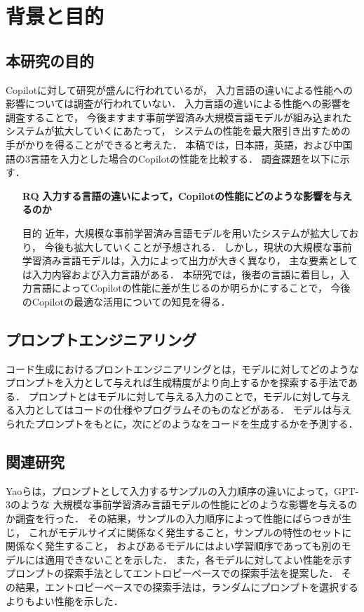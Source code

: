 \section{背景と目的\label{related_research}}

\subsection{本研究の目的}
  Copilotに対して研究が盛んに行われている\cite{Yao2022ACL}\cite{Nguyen2022MSR}\cite{Sobania2022GECCO}\cite{Dakhel2022arXiv}\cite{Vaithilingam2022CHI}が，
  入力言語の違いによる性能への影響については調査が行われていない．
  入力言語の違いによる性能への影響を調査することで，
  今後ますます事前学習済み大規模言語モデルが組み込まれたシステムが拡大していくにあたって，
  システムの性能を最大限引き出すための手がかりを得ることができると考えた．
  本稿では，日本語，英語，および中国語の3言語を入力とした場合のCopilotの性能を比較する．
  調査課題を以下に示す．

  
  \begin{itemize}
    \item[\textbf{RQ}] \textbf{入力する言語の違いによって，Copilotの性能にどのような影響を与えるのか}
      \item[目的]{近年，大規模な事前学習済み言語モデルを用いたシステムが拡大しており，
      今後も拡大していくことが予想される．
      しかし，現状の大規模な事前学習済み言語モデルは，入力によって出力が大きく異なり，
      主な要素としては入力内容および入力言語がある．
      本研究では，後者の言語に着目し，入力言語によってCopilotの性能に差が生じるのか明らかにすることで，
      今後のCopilotの最適な活用についての知見を得る．}
  \end{itemize}

\subsection{プロンプトエンジニアリング}
  コード生成におけるプロントエンジニアリングとは，モデルに対してどのようなプロンプトを入力として与えれば生成精度がより向上するかを探索する手法である．
  プロンプトとはモデルに対して与える入力のことで，モデルに対して与える入力としてはコードの仕様やプログラムそのものなどがある．
  モデルは与えられたプロンプトをもとに，次にどのようなをコードを生成するかを予測する．

\subsection{関連研究}
  Yaoら\cite{Yao2022ACL}は，プロンプトとして入力するサンプルの入力順序の違いによって，GPT-3のような
  大規模な事前学習済み言語モデルの性能にどのような影響を与えるのか調査を行った．
  その結果，サンプルの入力順序によって性能にばらつきが生じ，
  これがモデルサイズに関係なく発生すること，サンプルの特性のセットに関係なく発生すること，
  およびあるモデルにはよい学習順序であっても別のモデルには適用できないことを示した．
  また，各モデルに対してよい性能を示すプロンプトの探索手法としてエントロピーベースでの探索手法を提案した．
  その結果，エントロピーベースでの探索手法は，ランダムにプロンプトを選択するよりもよい性能を示した．

